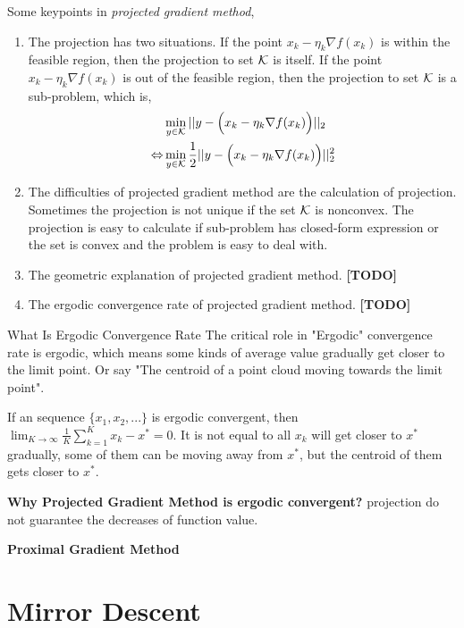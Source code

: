 	Some keypoints in \emph{projected gradient method},
	\begin{enumerate}
		\item The projection has two situations. If the point $x_k-\eta_k\nabla f(x_k)$ is within the feasible region, then the projection to set $\mathcal{K}$ is itself. If the point $x_k-\eta_k\nabla f(x_k)$ is out of the feasible region, then the projection to set $\mathcal{K}$ is a sub-problem, which is,
		\begin{equation*}
			\begin{split}
				&\min_{y\in\mathcal{K}} ||y-\Big(x_k-\eta_k\nabla f(x_k)\Big)||_2 \\
				\Leftrightarrow &\min_{y\in\mathcal{K}} \frac{1}{2}||y-\Big(x_k-\eta_k\nabla f(x_k)\Big)||_2^2 
			\end{split}
		\end{equation*}
		\item The difficulties of projected gradient method are the calculation of projection. Sometimes the projection is not unique if the set $\mathcal{K}$ is nonconvex. The projection is easy to calculate if sub-problem has closed-form expression or the set is convex and the problem is easy to deal with.
		\item The geometric explanation of projected gradient method. \textbf{[TODO]}
		\item The ergodic convergence rate of projected gradient method. \textbf{[TODO]}
	\end{enumerate}
	\begin{remark}{What Is Ergodic Convergence Rate}{}
		The critical role in "Ergodic" convergence rate is ergodic, which means some kinds of average value gradually get closer to the limit point. Or say "The centroid of a point cloud moving towards the limit point"\cite{andersen2024projectedgradientalgorithm}. 
		
		If an sequence $\{x_1,x_2,...\}$ is ergodic convergent, then $\lim_{K\rightarrow \infty}\frac{1}{K}\sum_{k=1}^K x_k -x^*=0$. It is not equal to all $x_k$ will get closer to $x^*$ gradually, some of them can be moving away from $x^*$, but the centroid of them gets closer to $x^*$.
		
		\textbf{Why Projected Gradient Method is ergodic convergent?}
		projection do not guarantee the decreases of function value.
	\end{remark}

	\textbf{Proximal Gradient Method}
	
	
	\section{Mirror Descent}
	
